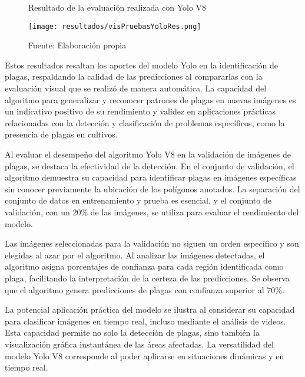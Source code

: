 \newpage

\begin{figure}[h]
	\centering
	\caption{Resultado de la evaluación realizada con Yolo V8}
	\texttt{[image: resultados/visPruebasYoloRes.png]}
	\caption*{\footnotesize Fuente: Elaboración propia}
	\label{fig:figuraVisPruebasYoloRes}
\end{figure}

\newpage

Estos resultados resaltan los aportes del modelo Yolo en la identificación de plagas, respaldando la calidad de las predicciones al compararlas con la evaluación visual que se realizó de manera automática. La capacidad del algoritmo para generalizar y reconocer patrones de plagas en nuevas imágenes es un indicativo positivo de su rendimiento y validez en aplicaciones prácticas relacionadas con la detección y clasificación de problemas específicos, como la presencia de plagas en cultivos. \newline

Al evaluar el desempeño del algoritmo Yolo V8 en la validación de imágenes de plagas, se destaca la efectividad de la detección. En el conjunto de validación, el algoritmo demuestra su capacidad para identificar plagas en imágenes específicas sin conocer previamente la ubicación de los polígonos anotados. La separación del conjunto de datos en entrenamiento y prueba es esencial, y el conjunto de validación, con un 20\% de las imágenes, se utiliza para evaluar el rendimiento del modelo. \newline

Las imágenes seleccionadas para la validación no siguen un orden específico y son elegidas al azar por el algoritmo. Al analizar las imágenes detectadas, el algoritmo asigna porcentajes de confianza para cada región identificada como plaga, facilitando la interpretación de la certeza de las predicciones. Se observa que el algoritmo genera predicciones de plagas con confianza superior al 70\%. \newline

La potencial aplicación práctica del modelo se ilustra al considerar su capacidad para clasificar imágenes en tiempo real, incluso mediante el análisis de videos. Esta capacidad permite no solo la detección de plagas, sino también la visualización gráfica instantánea de las áreas afectadas. La versatilidad del modelo Yolo V8 corresponde al poder aplicarse en situaciones dinámicas y en tiempo real.

\newpage